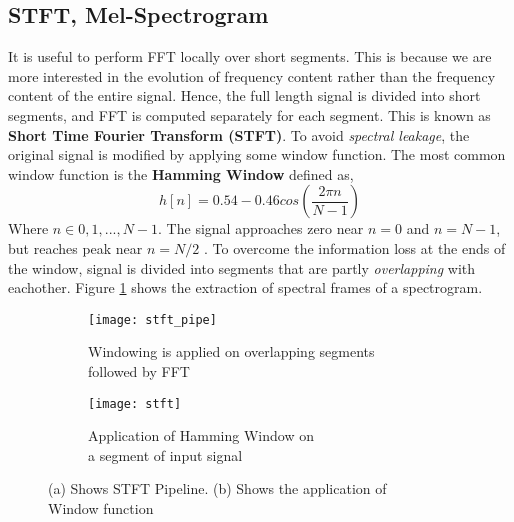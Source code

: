 \subsection{STFT, Mel-Spectrogram}
\label{stft}
It is useful to perform FFT locally over short segments. This is because we are more interested in the evolution of frequency content rather than the frequency content of the entire signal. Hence, the full length signal is divided into short segments, and FFT is computed separately for each segment. This is known as \textbf{Short Time Fourier Transform (STFT)}. To avoid \textit{spectral leakage}, the original signal is modified by applying some window function. The most common window function is the \textbf{Hamming Window} defined as,
\begin{equation}
h[n] = 0.54 - 0.46cos(\frac{2 \pi n}{N-1})
\end{equation}
Where $n \in {0,1,...,N-1}$. The signal approaches zero near $n=0$ and $n=N-1$, but reaches peak near $n=N/2$ \cite{specLeak}. To overcome the information loss at the ends of the window, signal is divided into segments that are partly \textit{overlapping} with eachother. Figure \ref{fig:stftPipe} shows the extraction of spectral frames of a spectrogram.  
\begin{figure}[h]
       \begin{subfigure}[b]{0.6\textwidth}
        \texttt{[image: stft\_pipe]}
        \caption{Windowing is applied on overlapping segments\\ followed by FFT }
        \label{fig:stftPipe}
       \end{subfigure}
	    \begin{subfigure}[b]{0.4\textwidth}
        \texttt{[image: stft]}
        \caption{
        Application of Hamming Window on \\a segment of input signal
        }
        \label{fig:HammingWindow}
       \end{subfigure}
       \caption{(a) Shows STFT Pipeline. (b) Shows the application of \\Window function}\label{fig:STFT}
\end{figure}
\bigskip


